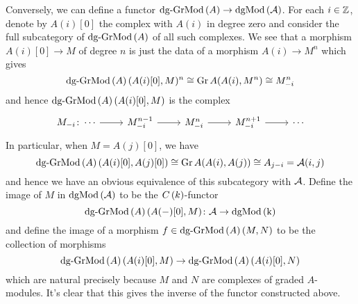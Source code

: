 \documentclass[dissertation.tex]{subfiles}
\begin{document}
Conversely, we can define a functor $\operatorname{dg-GrMod}\left(A\right) \to \operatorname{dgMod\left(\mathcal{A}\right)}$.
For each $i \in \mathbb{Z}$, denote by $A(i)[0]$ the complex with $A(i)$ in degree zero and consider the full subcategory of $\operatorname{dg-GrMod}\left(A\right)$ of all such complexes.
We see that a morphism $A(i)[0] \to M$ of degree $n$ is just the data of a morphism $A(i) \to M^n$
which gives
$$\operatorname{dg-GrMod}\left(A\right)(A(i)[0],M)^n \cong \operatorname{Gr}A(A(i), M^n) \cong M^n_{-i}$$
and hence $\operatorname{dg-GrMod}\left(A\right)(A(i)[0],M)$ is the complex
$$\begin{tikzcd}
  M_{-i} \colon \cdots \arrow{r} & M^{n-1}_{-i} \arrow{r} & M^n_{-i} \arrow{r} & M^{n+1}_{-i} \arrow{r} & \cdots
\end{tikzcd}$$
In particular, when $M = A(j)[0]$, we have 
$$\operatorname{dg-GrMod}\left(A\right)(A(i)[0], A(j)[0]) \cong \operatorname{Gr}A(A(i), A(j)) \cong A_{j - i} = \mathcal{A}(i,j)$$
and hence we have an obvious equivalence of this subcategory with $\mathcal{A}$.
Define the image of $M$ in $\operatorname{dgMod\left(\mathcal{A}\right)}$ to be the $C\left(k\right)$-functor 
$$\operatorname{dg-GrMod}\left(A\right)(A( - )[0], M) \colon \mathcal{A} \to \operatorname{dgMod\left(k\right)}$$
and define the image of a morphism $f \in \operatorname{dg-GrMod}\left(A\right)(M,N)$ to be the collection of morphisms
$$\operatorname{dg-GrMod}\left(A\right)(A(i)[0], M) \to \operatorname{dg-GrMod}\left(A\right)(A(i)[0], N)$$
which are natural precisely because $M$ and $N$ are complexes of graded $A$-modules.
It's clear that this gives the inverse of the functor constructed above.
\end{document}
